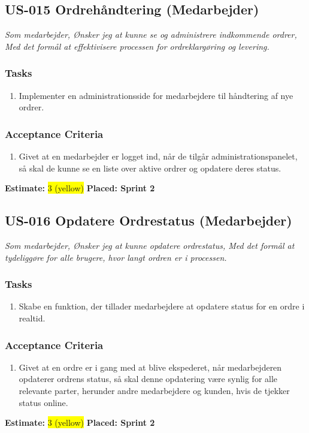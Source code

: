 \subsection{US-015 Ordrehåndtering (Medarbejder)}
\label{sec:US-015}
\textit{Som medarbejder, Ønsker jeg at kunne se og administrere indkommende ordrer, Med det formål at effektivisere processen for ordreklargøring og levering.}
\subsubsection*{\textbf{Tasks}}
\begin{enumerate}
  \item Implementer en administrationsside for medarbejdere til håndtering af nye ordrer.
\end{enumerate}
\subsubsection*{\textbf{Acceptance Criteria}}
\begin{enumerate}
  \item Givet at en medarbejder er logget ind, når de tilgår administrationspanelet, så skal de kunne se en liste over aktive ordrer og opdatere deres status.
\end{enumerate}
\textbf{Estimate:} \colorbox{yellow}{3 (yellow)}
\textbf{Placed: Sprint 2}
\par\noindent\dotfill

\subsection{US-016 Opdatere Ordrestatus (Medarbejder)}
\label{sec:US-016}
\textit{Som medarbejder, Ønsker jeg at kunne opdatere ordrestatus, Med det formål at tydeliggøre for alle brugere, hvor langt ordren er i processen.}
\subsubsection*{\textbf{Tasks}}
\begin{enumerate}
  \item Skabe en funktion, der tillader medarbejdere at opdatere status for en ordre i realtid.
\end{enumerate}
\subsubsection*{\textbf{Acceptance Criteria}}
\begin{enumerate}
  \item Givet at en ordre er i gang med at blive ekspederet, når medarbejderen opdaterer ordrens status, så skal denne opdatering være synlig for alle relevante parter, herunder andre medarbejdere og kunden, hvis de tjekker status online.
\end{enumerate}
\textbf{Estimate:} \colorbox{yellow}{3 (yellow)}
\textbf{Placed: Sprint 2}
\par\noindent\dotfill

